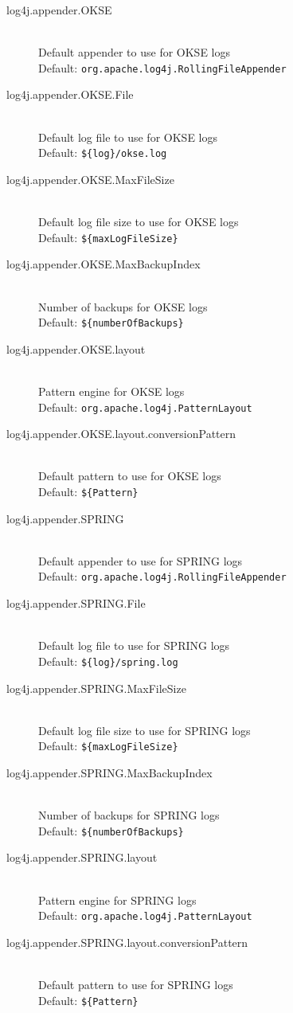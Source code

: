 \begin{description}
  \item[log4j.appender.OKSE] \hfill \\
  Default appender to use for OKSE logs \hfill \\ Default: \verb!org.apache.log4j.RollingFileAppender!
  \item[log4j.appender.OKSE.File] \hfill \\
  Default log file to use for OKSE logs \hfill \\ Default: \verb!${log}/okse.log!
   \item[log4j.appender.OKSE.MaxFileSize] \hfill \\
  Default log file size to use for OKSE logs \hfill \\ Default: \verb!${maxLogFileSize}!
   \item[log4j.appender.OKSE.MaxBackupIndex] \hfill \\
  Number of backups for OKSE logs \hfill \\ Default: \verb!${numberOfBackups}!
   \item[log4j.appender.OKSE.layout] \hfill \\
  Pattern engine for OKSE logs \hfill \\ Default: \verb!org.apache.log4j.PatternLayout!
   \item[log4j.appender.OKSE.layout.conversionPattern] \hfill \\
  Default pattern to use for OKSE logs \hfill \\ Default: \verb!${Pattern}!

    \item[log4j.appender.SPRING] \hfill \\
  Default appender to use for SPRING logs \hfill \\ Default: \verb!org.apache.log4j.RollingFileAppender!
  \item[log4j.appender.SPRING.File] \hfill \\
  Default log file to use for SPRING logs \hfill \\ Default: \verb!${log}/spring.log!
   \item[log4j.appender.SPRING.MaxFileSize] \hfill \\
  Default log file size to use for SPRING logs \hfill \\ Default: \verb!${maxLogFileSize}!
   \item[log4j.appender.SPRING.MaxBackupIndex] \hfill \\
  Number of backups for SPRING logs \hfill \\ Default: \verb!${numberOfBackups}!
   \item[log4j.appender.SPRING.layout] \hfill \\
  Pattern engine for SPRING logs \hfill \\ Default: \verb!org.apache.log4j.PatternLayout!
   \item[log4j.appender.SPRING.layout.conversionPattern] \hfill \\
  Default pattern to use for SPRING logs \hfill \\ Default: \verb!${Pattern}!


\end{description}
